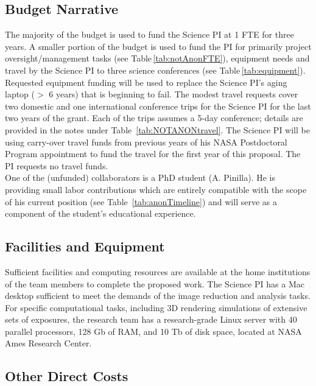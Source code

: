 \documentclass[usenames,dvipsnames,modern]{CLASS_FILES/aastex631}  %
\begin{document}
\subsection{Budget Narrative}
\label{subsec:budgetNarrative}
The majority of the budget is used to fund the Science PI at 1 FTE for three years. A smaller portion of the budget is used to fund the PI for primarily project oversight/management tasks (see Table\,\ref{tab:notAnonFTE}),  equipment needs and travel by the Science PI to three science conferences (see Table\,\ref{tab:equipment}). Requested equipment funding will be used to replace the Science PI's aging laptop ($>$ 6 years) that is beginning to fail. The modest travel requests cover two domestic and one international conference trips for the Science PI for the last two years of the grant. Each of the trips assumes a 5-day conference; details are provided in the notes under Table~\ref{tab:NOTANONtravel}. The Science PI will be using carry-over travel funds from previous years of his NASA Postdoctoral Program appointment to fund the travel for the first year of this proposal. The PI requests no travel funds. \\

One of the (unfunded) collaborators is a PhD student (A. Pinilla). He is providing small labor contributions which are entirely compatible with the scope of his current position (see Table~\ref{tab:anonTimeline}) and will serve as a component of the student's educational experience. 

\subsection{Facilities and Equipment}
Sufficient facilities and computing resources are available at the home institutions of the team members to complete the proposed work. The Science PI has a Mac desktop  sufficient to meet the demands of the image reduction and analysis tasks. For specific computational tasks, including 3D rendering simulations of extensive sets of exposures, the research team has a research-grade  Linux server with 40 parallel processors, 128 Gb of RAM, and 10 Tb of disk space, located at NASA Ames Research Center. \\


\newpage
\subsection{Other Direct Costs}

\end{document}
